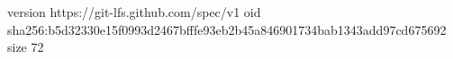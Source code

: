 version https://git-lfs.github.com/spec/v1
oid sha256:b5d32330e15f0993d2467bfffe93eb2b45a846901734bab1343add97cd675692
size 72
